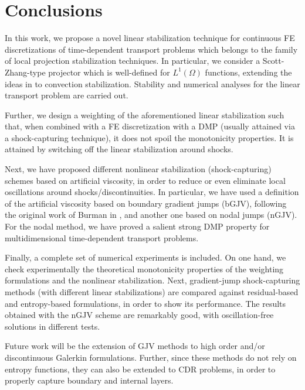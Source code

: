 \section{Conclusions}\label{s-concl}
%
In this work, we propose a novel linear stabilization technique for continuous FE
discretizations of time-dependent transport problems which belongs to the family of local 
projection stabilization techniques. In particular, we consider a Scott-Zhang-type projector which is 
well-defined for $L^1(\Omega)$ functions, extending the ideas in \cite{badia_stabilized_2012} to convection stabilization. 
Stability and numerical analyses for the linear transport problem are carried out. 

Further, we design a weighting of the aforementioned linear stabilization such that, 
when combined with a FE discretization with a DMP (usually
attained via a shock-capturing technique), it does not spoil the monotonicity properties. 
It is attained by switching off the linear stabilization around shocks.

Next, we have proposed different nonlinear stabilization (shock-capturing) schemes based on 
artificial viscosity, in order to reduce or even eliminate local oscillations around shocks/discontinuities. 
In particular, we have used a definition of the artificial viscosity based on boundary gradient jumps (bGJV),
following the original work of Burman in \cite{burman_nonlinear_2007}, and another one based on
nodal jumps (nGJV). For the nodal method, we have proved a salient strong DMP property for multidimensional 
time-dependent transport problems.%


Finally, a complete set of numerical experiments is included. On one hand, we check experimentally
the theoretical monotonicity properties of the weighting formulations and the nonlinear stabilization. Next, gradient-jump shock-capturing methods (with different linear stabilizations) are compared against residual-based and entropy-based formulations, in order to show its performance. The results obtained with the nGJV scheme are remarkably good, with oscillation-free solutions in different tests.

Future work will be the extension of GJV methods to high order and/or discontinuous Galerkin formulations.
Further, since these methods do not rely on entropy functions, they can
also be extended to CDR problems, in order to properly capture boundary and internal layers. 